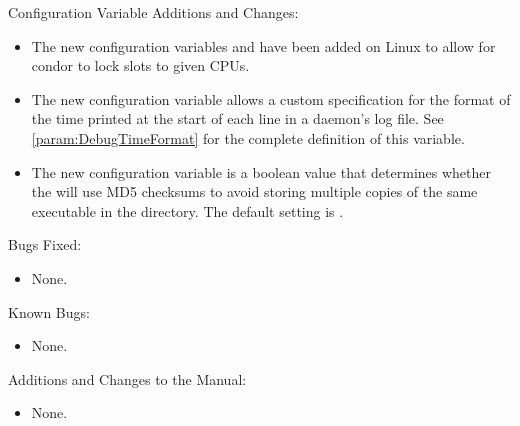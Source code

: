 \noindent Configuration Variable Additions and Changes:

\begin{itemize}

\item The new configuration variables  and 
 have been added on Linux to allow for
condor to lock slots to given CPUs.

\item The new configuration variable 
  allows a custom specification for the format of the time
  printed at the start of each line in a daemon's log file.
  See \ref{param:DebugTimeFormat} for the complete definition of
  this variable.

\item The new configuration variable 
  is a boolean value that determines whether the  will
  use MD5 checksums to avoid storing multiple copies of the same
  executable in the  directory. The default setting is
  .

\end{itemize}

\noindent Bugs Fixed:

\begin{itemize}

\item None.

\end{itemize}

\noindent Known Bugs:

\begin{itemize}

\item None.

\end{itemize}

\noindent Additions and Changes to the Manual:

\begin{itemize}

\item None.

\end{itemize}
